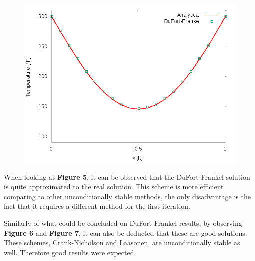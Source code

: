 \documentclass[12pt]{report}
\begin{document}
\begin{figure}[!htb]
  \centering
  \includegraphics[width=.5\linewidth]{DuFort-Frankelt_0_5.png}
\end{figure}

\par When looking at \textbf{Figure 5}, it can be observed that the DuFort-Frankel solution is quite approximated to the real solution. This scheme is more efficient comparing to other unconditionally stable methods, the only disadvantage is the fact that it requires a different method for the first iteration.

\par Similarly of what could be concluded on DuFort-Frankel results, by observing \textbf{Figure 6} and \textbf{Figure 7}, it can also be deducted that these are good solutions. These schemes, Crank-Nicholson and Laasonen, are unconditionally stable as well. Therefore good results were expected.
\end{document}
